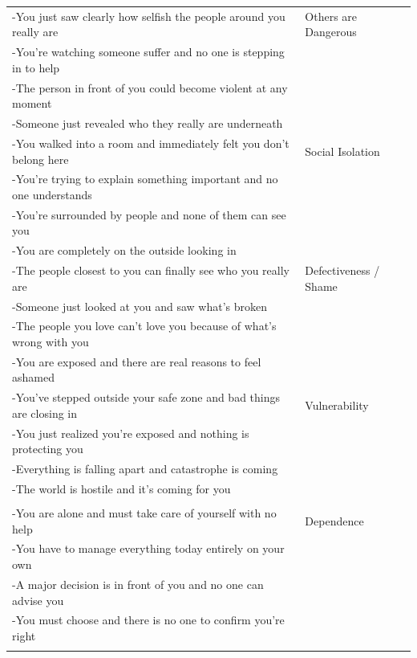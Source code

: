 \documentclass[11pt,oneside]{book}
\begin{document}
\begin{longtable}{>{\raggedright\arraybackslash}p{} >{\raggedright\arraybackslash}p{}}
-You just saw clearly how selfish the people around you really are & Others are Dangerous \\
-You're watching someone suffer and no one is stepping in to help &  \\
-The person in front of you could become violent at any moment &  \\
-Someone just revealed who they really are underneath &  \\
\addlinespace

-You walked into a room and immediately felt you don't belong here & Social Isolation \\
-You're trying to explain something important and no one understands &  \\
-You're surrounded by people and none of them can see you &  \\
-You are completely on the outside looking in &  \\
\addlinespace

-The people closest to you can finally see who you really are & Defectiveness / Shame \\
-Someone just looked at you and saw what's broken &  \\
-The people you love can't love you because of what's wrong with you &  \\
-You are exposed and there are real reasons to feel ashamed &  \\
\addlinespace

-You've stepped outside your safe zone and bad things are closing in & Vulnerability \\
-You just realized you're exposed and nothing is protecting you &  \\
-Everything is falling apart and catastrophe is coming &  \\
-The world is hostile and it's coming for you &  \\

\midrule
\multicolumn{2}{l}{\textbf{Autonomy \& Competence}} \\
\midrule

-You are alone and must take care of yourself with no help & Dependence \\
-You have to manage everything today entirely on your own &  \\
-A major decision is in front of you and no one can advise you &  \\
-You must choose and there is no one to confirm you're right &  \\
\addlinespace


\end{longtable}
\end{document}

